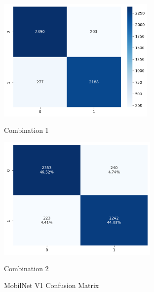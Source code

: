 \begin{figure}[H]
    \centering
    \begin{minipage}[b]{0.49\textwidth}
        \centering
        \includegraphics[width=\textwidth, height=6cm]{Figures/balanced_data/more_data/withoutbn/mn1/cm.png}
        \captionsetup{labelformat=empty}
        \caption{Combination 1}
        \label{fig:u_wo_r_cm}
    \end{minipage}
    \hfill
    \begin{minipage}[b]{0.49\textwidth}
        \centering
        \includegraphics[width=\textwidth, height=6cm]{Figures/balanced_data/more_data/withbn/mn1/cm.png}
        \captionsetup{labelformat=empty}
        \caption{Combination 2}
        \label{fig:u_w_r_cm}
    \end{minipage}
    \captionsetup{labelformat=default}
    \caption{MobilNet V1 Confusion Matrix}
\end{figure}



